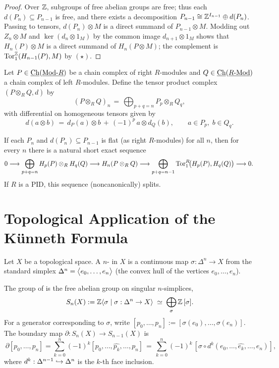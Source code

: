 \begin{proof}
	Over \( \mathbb{Z} \), subgroups of free abelian groups are free; thus each \( d(P_n)\subseteq P_{n-1} \) is free, and there exists a decomposition \( P_{n-1}\cong \mathbb{Z}^{I_{n-1}} \oplus d(P_n) \). Passing to tensors, \( d(P_n)\otimes M \) is a direct summand of \( P_{n-1}\otimes M \). Modding out \( Z_n\otimes M \) and \( \ker(d_n\otimes 1_M) \) by the common image \( d_{n+1}\otimes 1_M \) shows that \( H_n(P)\otimes M \) is a direct summand of \( H_n(P\otimes M) \); the complement is \( \operatorname{Tor}^{\mathbb{Z}}_1(H_{n-1}(P),M) \) by \( (\star) \).
\end{proof}

\begin{definition*}
	Let \( P \in \underline{\mathrm{Ch}}(\underline{\mathrm{Mod}\text{-}R}) \) be a chain complex of right \( R \)-modules and \( Q \in \underline{\mathrm{Ch}}(\underline{R\text{-}\mathrm{Mod}}) \) a chain complex of left \( R \)-modules. Define the tensor product complex \( (P\otimes_R Q, d) \) by
	\[
		\ (P\otimes_R Q)_n \,=\, \bigoplus_{p+q=n} P_p \otimes_R Q_q,
	\]
	with differential on homogeneous tensors given by
	\[
		\ d(a\otimes b) \,=\, d_P(a)\otimes b \, + \, (-1)^{p}\, a \otimes d_Q(b), \qquad a\in P_p,\; b\in Q_q.
	\]
\end{definition*}

\begin{theorem*}
	If each \( P_n \) and \( d(P_n)\subseteq P_{n-1} \) is flat (as right \( R \)-modules) for all \( n \), then for every \( n \) there is a natural short exact sequence
	\[
		0 \longrightarrow \bigoplus_{p+q=n} H_p(P)\otimes_R H_q(Q)
		\longrightarrow H_n(P\otimes_R Q)
		\longrightarrow \bigoplus_{p+q=n-1} \operatorname{Tor}^{R}_1\!\bigl(H_p(P), H_q(Q)\bigr)
		\longrightarrow 0 .
	\]
	If \( R \) is a PID, this sequence (noncanonically) splits.
\end{theorem*}

\section{Topological Application of the K\"unneth  Formula}

Let \( X \) be a topological space. A  \( n \)- in \( X \) is a continuous map \( \sigma: \Delta^{n} \to X \) from the standard simplex \( \Delta^{n} = \bigl\langle e_0,\dots,e_n \bigr\rangle \) (the convex hull of the vertices \( e_0,\dots,e_n \)).

\begin{definition*}
	The group of  is the free abelian group on singular \( n \)-simplices,
	\[
		\ S_n(X) := \mathbb{Z}\langle \sigma \mid \sigma: \Delta^n\to X \rangle \;\simeq\; \bigoplus_{\sigma} \mathbb{Z}\,[\sigma] .
	\]
	For a generator corresponding to \( \sigma \), write \( [p_0,\dots,p_n] := [\sigma(e_0),\dots,\sigma(e_n)] \). The boundary map \( \partial: S_n(X) \to S_{n-1}(X) \) is
	\[
		\ \partial[p_0,\dots,p_n] = \sum_{k=0}^{n} (-1)^k [p_0,\dots, \widehat{p_k},\dots,p_n] \,=\, \sum_{k=0}^{n} (-1)^k\, [\sigma\circ d^{k}(e_0,\dots,\widehat{e_k},\dots,e_n)],
	\]
	where \( d^{k}: \Delta^{n-1}\hookrightarrow \Delta^{n} \) is the \( k \)-th face inclusion.
\end{definition*}

